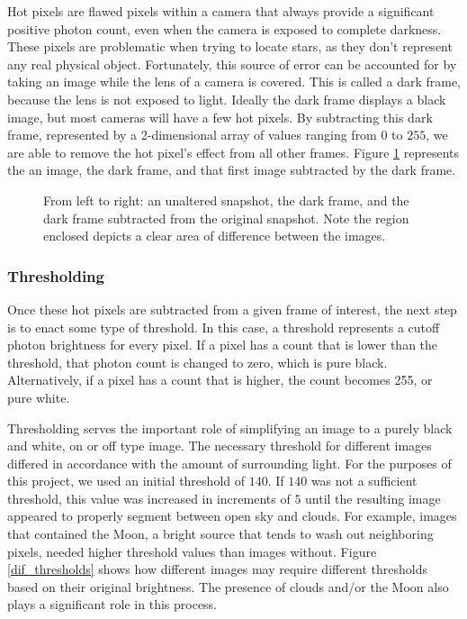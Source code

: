 Hot pixels are flawed pixels within a camera that always provide a significant positive photon count, even when the camera is exposed to complete darkness.
These pixels are problematic when trying to locate stars, as they don't represent any real physical object.
Fortunately, this source of error can be accounted for by taking an image while the lens of a camera is covered.  
This is called a dark frame, because the lens is not exposed to light.
Ideally the dark frame displays a black image, but most cameras will have a few hot pixels.
By subtracting this dark frame, represented by a 2-dimensional array of values ranging from $0$ to $255$, we are able to remove the hot pixel's effect from all other frames.
Figure \ref{hotpix} represents the an image, the dark frame, and that first image subtracted by the dark frame.



\begin{figure}[ht!]
  \caption{From left to right: an unaltered snapshot, the dark frame, and the dark frame subtracted from the original snapshot.  Note the region enclosed depicts a clear area of difference between the images.}
  \label{hotpix}
\end{figure}



\subsubsection{Thresholding}

Once these hot pixels are subtracted from a given frame of interest, the next step is to enact some type of threshold.
In this case, a threshold represents a cutoff photon brightness for every pixel.  
If a pixel has a count that is lower than the threshold, that photon count is changed to zero, which is pure black.  
Alternatively, if a pixel has a count that is higher, the  count becomes 255, or pure white.  

Thresholding serves the important role of simplifying an image to a purely black and white, on or off type image.
The necessary threshold for different images differed in accordance with the amount of surrounding light.
For the purposes of this project, we used an initial threshold of $140$.
If $140$ was not a sufficient threshold, this value was increased in increments of $5$ until the resulting image appeared to properly segment between open sky and clouds. 
For example, images that contained the Moon, a bright source that tends to wash out neighboring pixels, needed higher threshold values than images without.
Figure \ref{dif_thresholds} shows how different images may require different thresholds based on their original brightness.
The presence of clouds and/or the Moon also plays a significant role in this process.

